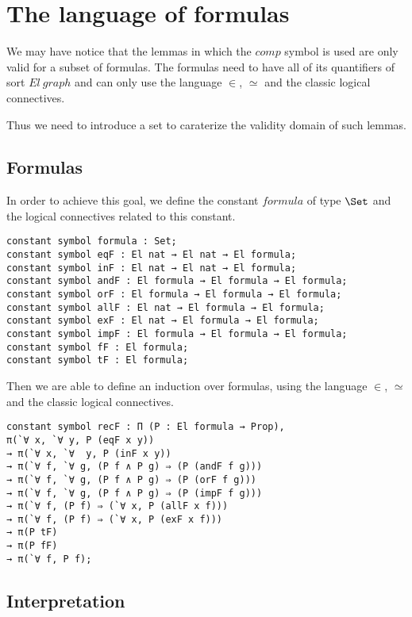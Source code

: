 \documentclass[a4paper]{article}
\begin{document}
\section{The language of formulas}

We may have notice that the lemmas in which the $comp$ symbol is used are only valid for a subset of formulas. The formulas need to have all of its quantifiers of sort $El~graph$ and can only use the language $\in$, $\simeq$ and the classic logical connectives.

Thus we need to introduce a set to caraterize the validity domain of such lemmas.

\subsection{Formulas}

In order to achieve this goal, we define the constant $formula$ of type $\Set$ and the logical connectives related to this constant.

\begin{lstlisting}
constant symbol formula : Set;
constant symbol eqF : El nat → El nat → El formula;
constant symbol inF : El nat → El nat → El formula;
constant symbol andF : El formula → El formula → El formula;
constant symbol orF : El formula → El formula → El formula;
constant symbol allF : El nat → El formula → El formula;
constant symbol exF : El nat → El formula → El formula;
constant symbol impF : El formula → El formula → El formula;
constant symbol fF : El formula;
constant symbol tF : El formula;
\end{lstlisting}

Then we are able to define an induction over formulas, using the language $\in$, $\simeq$ and the classic logical connectives.

\begin{lstlisting}
constant symbol recF : Π (P : El formula → Prop), 
π(`∀ x, `∀ y, P (eqF x y))
→ π(`∀ x, `∀  y, P (inF x y))
→ π(`∀ f, `∀ g, (P f ∧ P g) ⇒ (P (andF f g)))
→ π(`∀ f, `∀ g, (P f ∧ P g) ⇒ (P (orF f g)))
→ π(`∀ f, `∀ g, (P f ∧ P g) ⇒ (P (impF f g)))
→ π(`∀ f, (P f) ⇒ (`∀ x, P (allF x f)))
→ π(`∀ f, (P f) ⇒ (`∀ x, P (exF x f)))
→ π(P tF)
→ π(P fF)
→ π(`∀ f, P f);
\end{lstlisting}

\subsection{Interpretation}
\end{document}
